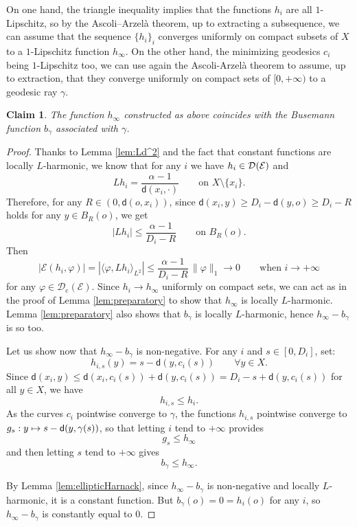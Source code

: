 \documentclass[10pt]{amsart}
\newcommand\mto{\mathchoice{\longmapsto}{\mapsto}{\mapsto}{\mapsto}}
\newcommand{\rmc}{\mathrm{c}}
\let\backslash\setminus
\newcommand{\NoChangel}[1]{%
\expandafter\let\csname old\string#1\endcsname=#1
\let#1=\relax
\newcommand{#1}{\mathcode`l="716C\csname old\string#1\endcsname\mathcode`l="7160 }%
}
\theoremstyle{plain}
\newtheorem{claim}[theorem]{Claim}
\theoremstyle{definition}
\newcommand{\cE}{\mathcal{E}}
\newcommand{\cD}{\mathcal{D}}
\let\phi\varphi
\newcommand{\loc}{\mathrm{loc}}\NoChangel{\loc}
\newcommand{\dist}{\mathsf{d}}
\begin{document}
On one hand, the triangle inequality implies that the functions $h_i$ are all $1$-Lipschitz, so by the Ascoli--Arzelà theorem, up to extracting a subsequence, we can assume that the sequence $\{h_i\}_i$ converges uniformly on compact subsets of $X$ to a $1$-Lipschitz function $h_\infty$. On the other hand, the minimizing geodesics $c_i$ being $1$-Lipschitz too, we can use again the Ascoli-Arzelà theorem to assume, up to extraction, that they converge uniformly on compact sets of $[0,+\infty)$ to a geodesic ray $\gamma$.

\begin{claim}\label{claim2}
The function $h_\infty$ constructed as above coincides with the Busemann function $b_\gamma$ associated with $\gamma$.
\end{claim}

\begin{proof}
Thanks to Lemma \ref{lem:Ld^2} and the fact that constant functions are locally $L$-harmonic, we know that for any $i$ we have $h_i \in \cD_{\loc}(\cE)$ and
\[
Lh_i = \frac{\alpha-1}{\dist(x_i,\cdot)} \qquad \text{on $X \backslash \{x_i\}$}.
\]
Therefore, for any $R\in(0,\dist(o,x_i))$, since $\dist(x_i,y)\ge D_i-\dist(y,o)\ge D_i-R$ holds for any $y \in B_R(o)$, we get
\begin{equation}\label{eq:D5.1}
|Lh_i| \le \frac{\alpha-1}{D_i-R} \qquad \text{on $B_R(o)$.}
\end{equation}
Then
\begin{equation}\label{eq:wesh}
|\cE(h_i,\phi)| = |\langle \phi, L h_i\rangle_{L^2}| \le \frac{\alpha-1}{D_i-R}\,\|\phi\|_1 \to 0 \qquad \text{when $i \to +\infty$}
\end{equation}
for any $\phi \in \cD_\rmc(\cE)$. Since $h_i \to h_\infty$ uniformly on compact sets, we can act as in the proof of Lemma \ref{lem:preparatory} to show that $h_\infty$ is locally $L$-harmonic. Lemma \ref{lem:preparatory} also shows that $b_\gamma$ is locally $L$-harmonic, hence $h_\infty - b_\gamma$ is so too.

Let us show now that $h_\infty - b_\gamma$ is non-negative. For any $i$ and $s \in [0,D_i]$, set:
\[
h_{i,s}(y)=s-\dist(y,c_i(s)) \qquad \forall y \in X.
\]
Since $\dist(x_i,y) \le \dist(x_i,c_i(s))+\dist(y,c_i(s))=D_i -s + \dist(y,c_i(s))$ for all $y \in X$, we have
\[
h_{i,s} \le h_i.
\]
As the curves $c_i$ pointwise converge to $\gamma$, the functions $h_{i,s}$ pointwise converge to $g_s:y \mto s - \dist(y,\gamma(s))$, so that letting $i$ tend to $+\infty$ provides
\[
g_s \le h_\infty
\]
and then letting $s$ tend to $+\infty$ gives
\[
b_\gamma \le h_{\infty}.
\]

By Lemma \ref{lem:ellipticHarnack}, since $h_\infty - b_\gamma$ is non-negative and locally $L$-harmonic, it is a constant function. But $b_\gamma(o)=0=h_i(o)$ for any $i$, so $h_\infty - b_\gamma$ is constantly equal to $0$.
\end{proof}
\end{document}
